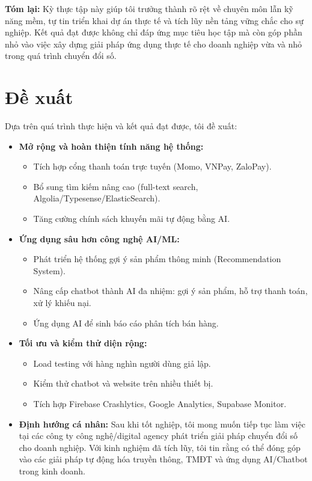 \noindent
\textbf{Tóm lại:} Kỳ thực tập này giúp tôi trưởng thành rõ rệt về chuyên môn lẫn kỹ năng mềm, 
tự tin triển khai dự án thực tế và tích lũy nền tảng vững chắc cho sự nghiệp. 
Kết quả đạt được không chỉ đáp ứng mục tiêu học tập mà còn góp phần nhỏ vào việc xây dựng giải pháp ứng dụng thực tế 
cho doanh nghiệp vừa và nhỏ trong quá trình chuyển đổi số.

\section{Đề xuất}
Dựa trên quá trình thực hiện và kết quả đạt được, tôi đề xuất:

\begin{itemize}
    \item \textbf{Mở rộng và hoàn thiện tính năng hệ thống:}
    \begin{itemize}
        \item Tích hợp cổng thanh toán trực tuyến (Momo, VNPay, ZaloPay).
        \item Bổ sung tìm kiếm nâng cao (full-text search, Algolia/Typesense/ElasticSearch).
        \item Tăng cường chính sách khuyến mãi tự động bằng AI.
    \end{itemize}
    
    \item \textbf{Ứng dụng sâu hơn công nghệ AI/ML:}
    \begin{itemize}
        \item Phát triển hệ thống gợi ý sản phẩm thông minh (Recommendation System).
        \item Nâng cấp chatbot thành AI đa nhiệm: gợi ý sản phẩm, hỗ trợ thanh toán, xử lý khiếu nại.
        \item Ứng dụng AI để sinh báo cáo phân tích bán hàng.
    \end{itemize}
    
    \item \textbf{Tối ưu và kiểm thử diện rộng:}
    \begin{itemize}
        \item Load testing với hàng nghìn người dùng giả lập.
        \item Kiểm thử chatbot và website trên nhiều thiết bị.
        \item Tích hợp Firebase Crashlytics, Google Analytics, Supabase Monitor.
    \end{itemize}
    
    \item \textbf{Định hướng cá nhân:} 
    Sau khi tốt nghiệp, tôi mong muốn tiếp tục làm việc tại các công ty công nghệ/digital agency 
    phát triển giải pháp chuyển đổi số cho doanh nghiệp. 
    Với kinh nghiệm đã tích lũy, tôi tin rằng có thể đóng góp vào các giải pháp tự động hóa truyền thông, 
    TMĐT và ứng dụng AI/Chatbot trong kinh doanh.
\end{itemize}

